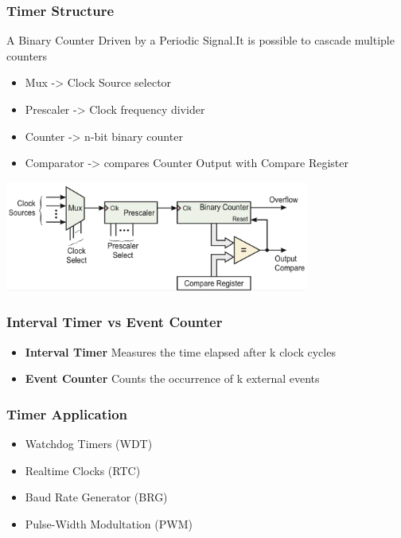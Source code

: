 \subsubsection{Timer Structure}
A Binary Counter Driven by a Periodic Signal.It is possible to cascade multiple counters\\
\vspace{1cm}
\begin{minipage}{9cm}
	\begin{itemize}
		\item Mux -> Clock Source selector
		\item Prescaler -> Clock frequency divider
		\item Counter -> n-bit binary counter
		\item Comparator -> compares Counter Output with Compare Register
	\end{itemize}
\end{minipage}
\begin{minipage}{10cm}
	\includegraphics[width=10cm]{images/timerstructure.png} 
\end{minipage}
\begin{multicols}{2}
	\subsubsection{Interval Timer vs Event Counter}
	\begin{itemize}
		\item \textbf{Interval Timer}
		\subitem Measures the time elapsed after k clock cycles
		\item \textbf{Event Counter}
		\subitem Counts the occurrence of k external events
	\end{itemize}	
	\subsubsection{Timer Application}
	\begin{itemize}
		\item Watchdog Timers (WDT)
		\item Realtime Clocks (RTC)
		\item Baud Rate Generator (BRG)
		\item Pulse-Width Modultation (PWM)
	\end{itemize}
\end{multicols}

